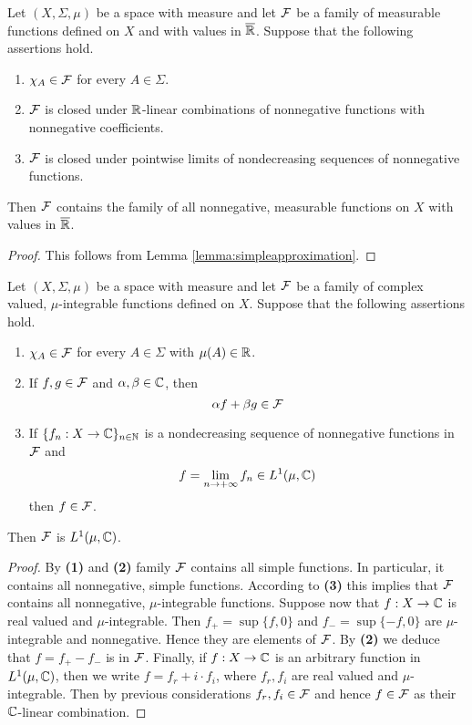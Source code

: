 \begin{corollary}\label{corollary:measurableinductionfornonnegative}
Let $(X,\Sigma,\mu)$ be a space with measure and let ${\mathcal F}$ be a family of measurable functions defined on $X$ and with values in $\overline{{\mathbb R}}$. Suppose that the following assertions hold.
\begin{enumerate}[label=\emph{\textbf{(\arabic*)}}, leftmargin=*]
\item $\chi_A\in {\mathcal F}$ for every $A\in \Sigma$.
\item ${\mathcal F}$ is closed under ${\mathbb R}$-linear combinations of nonnegative functions with nonnegative coefficients.
\item ${\mathcal F}$ is closed under pointwise limits of nondecreasing sequences of nonnegative functions.
\end{enumerate}
Then ${\mathcal F}$ contains the family of all nonnegative, measurable functions on $X$ with values in $\overline{{\mathbb R}}$.
\end{corollary}
\begin{proof}
This follows from Lemma \ref{lemma:simpleapproximation}.
\end{proof}

\begin{corollary}\label{corollary:measurableinductionforcomplex}
Let $(X,\Sigma,\mu)$ be a space with measure and let ${\mathcal F}$ be a family of complex valued, $\mu$-integrable functions defined on $X$. Suppose that the following assertions hold.
\begin{enumerate}[label=\emph{\textbf{(\arabic*)}}, leftmargin=*]
\item $\chi_A\in {\mathcal F}$ for every $A\in \Sigma$ with $\mu(A)\in {\mathbb R}$.
\item If $f, g\in {\mathcal F}$ and $\alpha, \beta\in {\mathbb C}$, then
$$\alpha f + \beta g\in {\mathcal F}$$
\item If $\{f_n:X\rightarrow {\mathbb C}\}_{n\in {\mathbb N}}$ is a nondecreasing sequence of nonnegative functions in ${\mathcal F}$ and
$$f = \lim_{n\rightarrow +\infty}f_n\in L^1(\mu, {\mathbb C})$$
then $f\in {\mathcal F}$.
\end{enumerate}
Then ${\mathcal F}$ is $L^1(\mu, {\mathbb C})$.
\end{corollary}
\begin{proof}
By \textbf{(1)} and \textbf{(2)} family ${\mathcal F}$ contains all simple functions. In particular, it contains all nonnegative, simple functions. According to \textbf{(3)} this implies that ${\mathcal F}$ contains all nonnegative, $\mu$-integrable functions. Suppose now that $f:X\rightarrow {\mathbb C}$ is real valued and $\mu$-integrable. Then $f_+ = \sup \{f, 0\}$ and $f_- = \sup\{-f, 0\}$ are $\mu$-integrable and nonnegative. Hence they are elements of ${\mathcal F}$. By \textbf{(2)} we deduce that $f = f_+ - f_-$ is in ${\mathcal F}$. Finally, if $f:X\rightarrow {\mathbb C}$ is an arbitrary function in $L^1(\mu, {\mathbb C})$, then we write $f = f_r + i\cdot f_i$, where $f_r, f_i$ are real valued and $\mu$-integrable. Then by previous considerations $f_r,f_i\in {\mathcal F}$ and hence $f\in {\mathcal F}$ as their ${\mathbb C}$-linear combination.
\end{proof}

